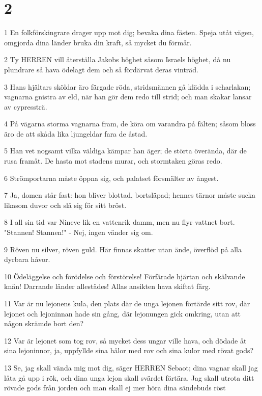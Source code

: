 \chapter{2}

\par 1 En folkförskingrare drager upp mot dig; bevaka dina fästen. Speja utåt vägen, omgjorda dina länder bruka din kraft, så mycket du förmår.
\par 2 Ty HERREN vill återställa Jakobs höghet såsom Israels höghet, då nu plundrare så hava ödelagt dem och så fördärvat deras vinträd.
\par 3 Hans hjältars sköldar äro färgade röda, stridsmännen gå klädda i scharlakan; vagnarna gnistra av eld, när han gör dem redo till strid; och man skakar lansar av cypressträ.
\par 4 På vägarna storma vagnarna fram, de köra om varandra på fälten; såsom bloss äro de att skåda lika ljungeldar fara de åstad.
\par 5 Han vet nogsamt vilka väldiga kämpar han äger; de störta överända, där de rusa framåt. De hasta mot stadens murar, och stormtaken göras redo.
\par 6 Strömportarna måste öppna sig, och palatset försmälter av ångest.
\par 7 Ja, domen står fast: hon bliver blottad, bortsläpad; hennes tärnor måste sucka likasom duvor och slå sig för sitt bröst.
\par 8 I all sin tid var Nineve lik en vattenrik damm, men nu flyr vattnet bort. "Stannen! Stannen!" - Nej, ingen vänder sig om.
\par 9 Röven nu silver, röven guld. Här finnas skatter utan ände, överflöd på alla dyrbara håvor.
\par 10 Ödeläggelse och förödelse och förstörelse! Förfärade hjärtan och skälvande knän! Darrande länder allestädes! Allas ansikten hava skiftat färg.
\par 11 Var är nu lejonens kula, den plats där de unga lejonen förtärde sitt rov, där lejonet och lejoninnan hade sin gång, där lejonungen gick omkring, utan att någon skrämde bort den?
\par 12 Var är lejonet som tog rov, så mycket dess ungar ville hava, och dödade åt sina lejoninnor, ja, uppfyllde sina hålor med rov och sina kulor med rövat gods?
\par 13 Se, jag skall vända mig mot dig, säger HERREN Sebaot; dina vagnar skall jag låta gå upp i rök, och dina unga lejon skall svärdet förtära. Jag skall utrota ditt rövade gods från jorden och man skall ej mer höra dina sändebuds röst

